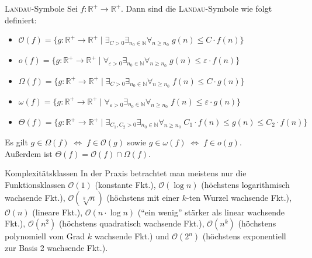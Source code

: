 \begin{Def}{\textsc{Landau}-Symbole}
    Sei $f: \mathbb{R}^+ \rightarrow \mathbb{R}^+$.
    Dann sind die \textsc{Landau}-Symbole wie folgt definiert:
    \begin{itemize}
        \item $\mathcal{O}(f) =
        \{g: \mathbb{R}^+ \rightarrow \mathbb{R}^+ \;|\;
        \exists_{C > 0} \exists_{n_0 \in \mathbb{N}}
        \forall_{n \ge n_0}\; g(n) \le C \cdot f(n)\}$

        \item $o(f) =
        \{g: \mathbb{R}^+ \rightarrow \mathbb{R}^+ \;|\;
        \forall_{\varepsilon > 0} \exists_{n_0 \in \mathbb{N}}
        \forall_{n \ge n_0}\; g(n) \le \varepsilon \cdot f(n)\}$

        \item $\Omega(f) =
        \{g: \mathbb{R}^+ \rightarrow \mathbb{R}^+ \;|\;
        \exists_{C > 0} \exists_{n_0 \in \mathbb{N}}
        \forall_{n \ge n_0}\; f(n) \le C \cdot g(n)\}$

        \item $\omega(f) =
        \{g: \mathbb{R}^+ \rightarrow \mathbb{R}^+ \;|\;
        \forall_{\varepsilon > 0} \exists_{n_0 \in \mathbb{N}}
        \forall_{n \ge n_0}\; f(n) \le \varepsilon \cdot g(n)\}$

        \item $\Theta(f) =
        \{g: \mathbb{R}^+ \rightarrow \mathbb{R}^+ \;|\;
        \exists_{C_1, C_2 > 0} \exists_{n_0 \in \mathbb{N}}
        \forall_{n \ge n_0}\; C_1 \cdot f(n) \le g(n) \le C_2 \cdot f(n)\}$
    \end{itemize}
    Es gilt $g \in \Omega(f) \;\Leftrightarrow\; f \in \mathcal{O}(g)$
    sowie $g \in \omega(f) \;\Leftrightarrow\; f \in o(g)$. \\
    Außerdem ist $\Theta(f) = \mathcal{O}(f) \cap \Omega(f)$.
\end{Def}

\begin{Def}{Komplexitätsklassen}
    In der Praxis betrachtet man meistens nur die Funktionsklassen
    $\mathcal{O}(1)$ (konstante Fkt.),
    $\mathcal{O}(\log n)$ (höchstens logarithmisch wachsende Fkt.),
    $\mathcal{O}(\sqrt[k]{n})$ (höchstens mit einer $k$-ten Wurzel wachsende
    Fkt.),
    $\mathcal{O}(n)$ (lineare Fkt.),
    $\mathcal{O}(n \cdot \log n)$ ("`ein wenig"' stärker als linear wachsende
    Fkt.),
    $\mathcal{O}(n^2)$ (höchstens quadratisch wachsende Fkt.),
    $\mathcal{O}(n^k)$ (höchstens polynomiell vom Grad $k$ wachsende Fkt.) und
    $\mathcal{O}(2^n)$ (höchstens exponentiell zur Basis 2 wachsende Fkt.).
\end{Def}

